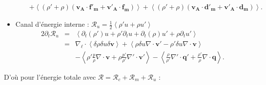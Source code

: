 \begin{itemize}
\begin{eqnarray}
&&+  \left<\left(\rho' + \rho\right)\left(\boldsymbol{v_A} \cdot \boldsymbol{f'_m} + \boldsymbol{v'_A} \cdot \boldsymbol{f_m}\right) \right>+ \left<\left(\rho' + \rho\right)\left(\boldsymbol{v_A} \cdot \boldsymbol{d'_m} + \boldsymbol{v'_A} \cdot \boldsymbol{d_m}\right)\right> . \nonumber
\end{eqnarray}
 \item Canal d'énergie interne :  $\mathcal{R}_{u} = \frac{1}{2}\left<\rho' u+\rho u'\right> $
\begin{eqnarray}
\label{eq:turb_cpi_Ru} 2\partial_t \mathcal{R}_{u} &=& \left<\partial_t \left(\rho'\right) u  + \rho' \partial_t u + \partial_t \left(\rho\right) u' + \rho \partial_t u'\right> \nonumber\\
&=&\nabla_{\boldsymbol{\ell}} \cdot \left<\delta \rho  \delta u \delta \boldsymbol{v} \right> + \left<  \rho \delta u \nabla \cdot \boldsymbol{v'}- \rho' \delta u \nabla \cdot \boldsymbol{v}\right> \nonumber\\
&&-\left< \rho' \frac{p}{\rho}   \nabla \cdot \boldsymbol{v}  + \rho \frac{p'}{\rho'}   \nabla' \cdot \boldsymbol{v'} \right> -\left<\frac{\rho}{\rho'}  \nabla' \cdot \boldsymbol{q'} + \frac{\rho'}{\rho}  \nabla \cdot \boldsymbol{q}  \right> .
\end{eqnarray}
\end{itemize}
D'où pour l'énergie totale avec $\mathcal{R} = \mathcal{R}_{c} + \mathcal{R}_{m} + \mathcal{R}_{u}$ :
